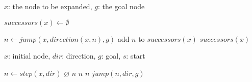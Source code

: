 \begin{algorithm}[b]
\caption{$generateSuccessors$}
\label{alg:successors}
\begin{algorithmic}[1]
\REQUIRE $x$: the node to be expanded, $g$: the goal node 

\STATE $successors(x) \leftarrow \emptyset$

\STATE $n \leftarrow jump(x, direction(x, n), g)$
\STATE add $n$ to $successors(x)$
\ENDFOR
\RETURN $successors(x)$

\end{algorithmic}
\end{algorithm}

\begin{algorithm}[b]
\caption{$jump$}
\label{alg:jump}
\begin{algorithmic}[1]
\REQUIRE $x$: initial node, $dir$: direction, $g$: goal, $s$: start

\STATE $n \leftarrow step(x, dir)$
	\RETURN $\varnothing$
\ENDIF
{}
	\RETURN $n$
\ENDIF
{}
	\RETURN $n$
\ENDIF
{}
			\RETURN $n$
		\ENDIF
	\ENDFOR
\ENDIF
\RETURN $jump(n, dir, g)$
\end{algorithmic}
\end{algorithm}

